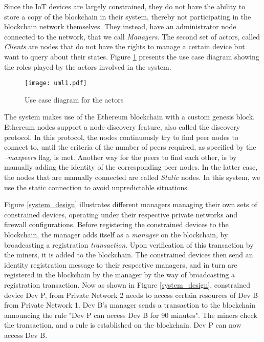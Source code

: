 \documentclass[english]{tktltiki}
\begin{document}
Since the IoT devices are largely constrained, they do not have the ability to store a copy of the blockchain in their system, thereby not participating in the blockchain network themselves. They instead, have an administrator node connected to the network, that we call \textit{Managers}. The second set of actors, called \textit{Clients} are nodes that do not have the rights to manage a certain device but want to query about their states. Figure \ref{use case} presents the use case diagram showing the roles played by the actors involved in the system. \newline 

\begin{figure}[H]
\begin{center}
\texttt{[image: uml1.pdf]}
\caption{Use case diagram for the actors}
\label{use case}
\end{center}
\end{figure}

The system makes use of the Ethereum blockchain with a custom genesis block. Ethereum nodes support a node discovery feature, also called the discovery protocol. In this protocol, the nodes continuously try to find peer nodes to connect to, until the criteria of the number of peers required, as specified by the \textit{--maxpeers} flag, is met. Another way for the peers to find each other, is by manually adding the identity of the corresponding peer nodes. In the latter case, the nodes that are manually connected are called \textit{Static} nodes. In this system, we use the static connection to avoid unpredictable situations. 

Figure \ref{system_design} illustrates different managers managing their own sets of constrained devices, operating under their respective private networks and firewall configurations. Before registering the constrained devices to the blockchain, the manager adds itself as a \textit{manager} on the blockchain, by broadcasting a registration \textit{transaction}. Upon verification of this transaction by the miners, it is added to the blockchain. The constrained devices then send an identity registration message to their respective managers, and in turn are registered in the blockchain by the manager by the way of broadcasting a registration transaction.
Now as shown in Figure \ref{system_design}, constrained device Dev P, from Private Network 2 needs to access certain resources of Dev B from Private Network 1. Dev B's manager sends a transaction to the blockchain announcing the rule "Dev P can access Dev B for 90 minutes". The miners check the transaction, and a rule is established on the blockchain. Dev P can now access Dev B.
\end{document}
